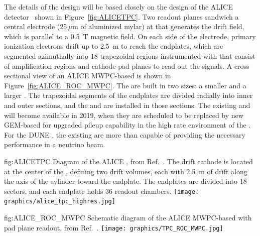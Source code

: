The details of the  design will be based closely on the design of the ALICE detector~\cite{Dellacasa:2000bm} shown in Figure~\ref{fig:ALICETPC}. Two readout planes sandwich a central  electrode (25$\,\mu$m of aluminized mylar) at  that generates the drift field, which is parallel to a \SI{0.5}{T} magnetic field. On each side of the electrode, primary ionization electrons drift up to \SI{2.5}{m} to reach the endplates, which are segmented azimuthally into 18 trapezoidal regions instrumented with  that consist of  amplification regions and cathode pad planes to read out the signals. A cross sectional view of an ALICE MWPC-based  is shown in Figure~\ref{fig:ALICE_ROC_MWPC}. The  are built in two sizes: a smaller  and a larger . The trapezoidal segments of the endplates are divided radially into inner and outer sections, and the  and  are installed in those sections. The existing  and  will become available in 2019, when they are scheduled to be replaced by new GEM-based  for upgraded pileup capability in the high rate environment of the . For the DUNE , the existing  are more than capable of providing the necessary performance in a neutrino beam.  

\begin{dunefigure}{fig:ALICETPC}
{Diagram of the ALICE , from Ref.~\cite{Alme:2010ke}. The drift  cathode is located at the center of the , defining two drift volumes, each with \SI{2.5}{m} of drift along the axis of the cylinder toward the endplate. The endplates are divided into 18 sectors, and each endplate holds 36 readout chambers.}
    \texttt{[image: graphics/alice\_tpc\_highres.jpg]}
\end{dunefigure}


\begin{dunefigure}{fig:ALICE_ROC_MWPC}
{Schematic diagram of the ALICE MWPC-based  with pad plane readout, from Ref.~\cite{Alme:2010ke}.}
    \texttt{[image: graphics/TPC\_ROC\_MWPC.jpg]}
\end{dunefigure}

